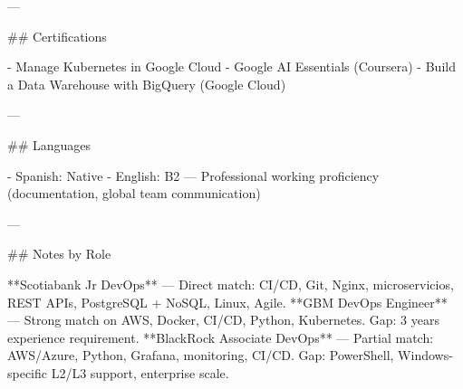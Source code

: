 ---

## Certifications

- Manage Kubernetes in Google Cloud
- Google AI Essentials (Coursera)
- Build a Data Warehouse with BigQuery (Google Cloud)

---

## Languages

- Spanish: Native
- English: B2 — Professional working proficiency (documentation, global team communication)

---

## Notes by Role

**Scotiabank Jr DevOps** — Direct match: CI/CD, Git, Nginx, microservicios, REST APIs, PostgreSQL + NoSQL, Linux, Agile.  
**GBM DevOps Engineer** — Strong match on AWS, Docker, CI/CD, Python, Kubernetes. Gap: 3 years experience requirement.  
**BlackRock Associate DevOps** — Partial match: AWS/Azure, Python, Grafana, monitoring, CI/CD. Gap: PowerShell, Windows-specific L2/L3 support, enterprise scale.